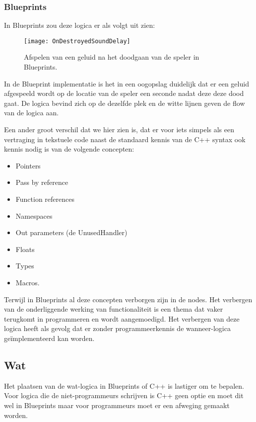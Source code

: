 \subsubsection{Blueprints}
In Blueprints zou deze logica er als volgt uit zien:

\begin{figure}[!ht]
  \centering
    \texttt{[image: OnDestroyedSoundDelay]}
    \caption{Afspelen van een geluid na het doodgaan van de speler in Blueprints.}
\end{figure}

In de Blueprint implementatie is het in een oogopslag duidelijk dat er een geluid afgespeeld wordt op de locatie van de speler een seconde nadat deze deze dood gaat. De logica bevind zich op de dezelfde plek en de witte lijnen geven de flow van de logica aan. 

Een ander groot verschil dat we hier zien is, dat er voor iets simpels als een vertraging in tekstuele code naast de standaard kennis van de C++ syntax ook kennis nodig is van de volgende concepten:

\begin{itemize}
	\item Pointers
	\item Pass by reference
	\item Function references
	\item Namespaces
	\item Out parameters (de UnusedHandler)
	\item Floats
	\item Types
	\item Macros. 
\end{itemize}

Terwijl in Blueprints al deze concepten verborgen zijn in de nodes. Het verbergen van de onderliggende werking van functionaliteit is een thema dat vaker terugkomt in programmeren en wordt aangemoedigd. Het verbergen van deze logica heeft als gevolg dat er zonder programmeerkennis de wanneer-logica geïmplementeerd kan worden.

\subsection{Wat}

Het plaatsen van de wat-logica in Blueprints of C++ is lastiger om te bepalen. Voor logica die de niet-programmeurs schrijven is C++ geen optie en moet dit wel in Blueprints maar voor programmeurs moet er een afweging gemaakt worden.

